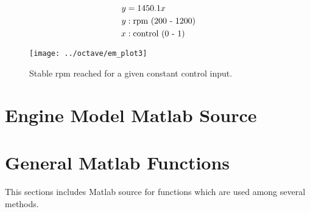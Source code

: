 \documentclass{article}
\begin{document}
\begin{align}
y &= 1450.1 x \label{eq:stable} \\
	y &: \text{rpm (200 - 1200)} \notag \\
	x &: \text{control (0 - 1)} \notag
\end{align}

\begin{figure}[htbp!]
\begin{center}
\texttt{[image: ../octave/em\_plot3]}
\end{center}
\caption{Stable rpm reached for a given constant control input.}
\label{fig:stable}
\end{figure}

\clearpage


\clearpage
\section{Engine Model Matlab Source}
\label{app:em_matlab}





\clearpage


\clearpage


\clearpage
\section{General Matlab Functions}
\label{app:gf_matlab}

This sections includes Matlab source for functions which are
used among several methods.


\end{document}
